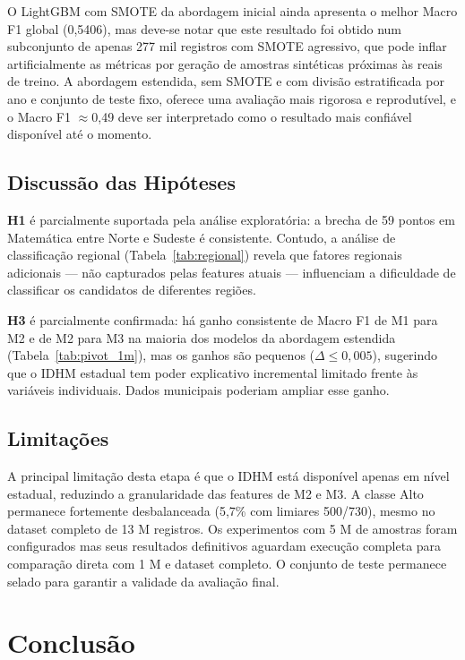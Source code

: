 \documentclass[12pt]{article}
\begin{document}
O LightGBM com SMOTE da abordagem inicial ainda apresenta o melhor
Macro F1 global (0,5406), mas deve-se notar que este resultado foi obtido
num subconjunto de apenas 277 mil registros com SMOTE agressivo, que
pode inflar artificialmente as métricas por geração de amostras
sintéticas próximas às reais de treino. A abordagem estendida, sem SMOTE
e com divisão estratificada por ano e conjunto de teste fixo, oferece uma
avaliação mais rigorosa e reprodutível, e o Macro F1 $\approx$0,49 deve
ser interpretado como o resultado mais confiável disponível até o momento.

\subsection{Discussão das Hipóteses}

\textbf{H1} é parcialmente suportada pela análise exploratória: a brecha
de 59 pontos em Matemática entre Norte e Sudeste é consistente. Contudo,
a análise de classificação regional (Tabela~\ref{tab:regional}) revela
que fatores regionais adicionais --- não capturados pelas features atuais
--- influenciam a dificuldade de classificar os candidatos de diferentes
regiões.

\textbf{H3} é parcialmente confirmada: há ganho consistente de Macro F1
de M1 para M2 e de M2 para M3 na maioria dos modelos da abordagem
estendida (Tabela~\ref{tab:pivot_1m}), mas os ganhos são pequenos
($\Delta \leq 0,005$), sugerindo que o IDHM estadual tem poder
explicativo incremental limitado frente às variáveis individuais. Dados
municipais poderiam ampliar esse ganho.

\subsection{Limitações}

A principal limitação desta etapa é que o IDHM está disponível apenas em
nível estadual, reduzindo a granularidade das features de M2 e M3. A
classe Alto permanece fortemente desbalanceada (5,7\% com limiares
500/730), mesmo no dataset completo de 13 M registros. Os experimentos
com 5 M de amostras foram configurados mas seus resultados definitivos
aguardam execução completa para comparação direta com 1 M e dataset
completo. O conjunto de teste permanece selado para garantir a validade
da avaliação final.

\section{Conclusão}
\end{document}
